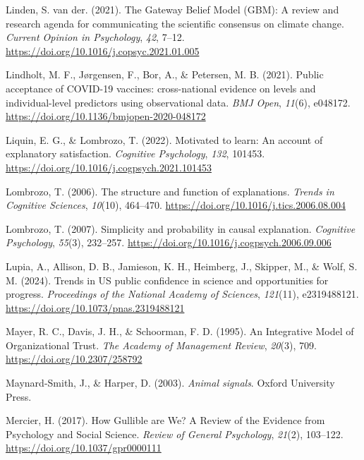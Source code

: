\documentclass[
  jou,
  floatsintext,
  longtable,
  nolmodern,
  notxfonts,
  notimes,
  colorlinks=true,linkcolor=blue,citecolor=blue,urlcolor=blue]{apa7}
\newlength{\cslhangindent}
\newenvironment{CSLReferences}[2] %
 {\begin{list}{}{%
  \setlength{\itemindent}{0pt}
  \setlength{\leftmargin}{0pt}
  \setlength{\parsep}{0pt}
  \ifodd #1
   \setlength{\leftmargin}{\cslhangindent}
   \setlength{\itemindent}{-1\cslhangindent}
  \fi
  \setlength{\itemsep}{#2\baselineskip}}}
 {\end{list}}
\begin{document}
\begin{CSLReferences}{1}{0}
Linden, S. van der. (2021). The Gateway Belief Model (GBM): A review and
research agenda for communicating the scientific consensus on climate
change. \emph{Current Opinion in Psychology}, \emph{42}, 7--12.
\url{https://doi.org/10.1016/j.copsyc.2021.01.005}

Lindholt, M. F., Jørgensen, F., Bor, A., \& Petersen, M. B. (2021).
Public acceptance of COVID-19 vaccines: cross-national evidence on
levels and individual-level predictors using observational data.
\emph{BMJ Open}, \emph{11}(6), e048172.
\url{https://doi.org/10.1136/bmjopen-2020-048172}

Liquin, E. G., \& Lombrozo, T. (2022). Motivated to learn: An account of
explanatory satisfaction. \emph{Cognitive Psychology}, \emph{132},
101453. \url{https://doi.org/10.1016/j.cogpsych.2021.101453}

Lombrozo, T. (2006). The structure and function of explanations.
\emph{Trends in Cognitive Sciences}, \emph{10}(10), 464--470.
\url{https://doi.org/10.1016/j.tics.2006.08.004}

Lombrozo, T. (2007). Simplicity and probability in causal explanation.
\emph{Cognitive Psychology}, \emph{55}(3), 232--257.
\url{https://doi.org/10.1016/j.cogpsych.2006.09.006}

Lupia, A., Allison, D. B., Jamieson, K. H., Heimberg, J., Skipper, M.,
\& Wolf, S. M. (2024). Trends in US public confidence in science and
opportunities for progress. \emph{Proceedings of the National Academy of
Sciences}, \emph{121}(11), e2319488121.
\url{https://doi.org/10.1073/pnas.2319488121}

Mayer, R. C., Davis, J. H., \& Schoorman, F. D. (1995). An Integrative
Model of Organizational Trust. \emph{The Academy of Management Review},
\emph{20}(3), 709. \url{https://doi.org/10.2307/258792}

Maynard-Smith, J., \& Harper, D. (2003). \emph{Animal signals}. Oxford
University Press.

Mercier, H. (2017). How Gullible are We? A Review of the Evidence from
Psychology and Social Science. \emph{Review of General Psychology},
\emph{21}(2), 103--122. \url{https://doi.org/10.1037/gpr0000111}


\end{CSLReferences}
\end{document}
